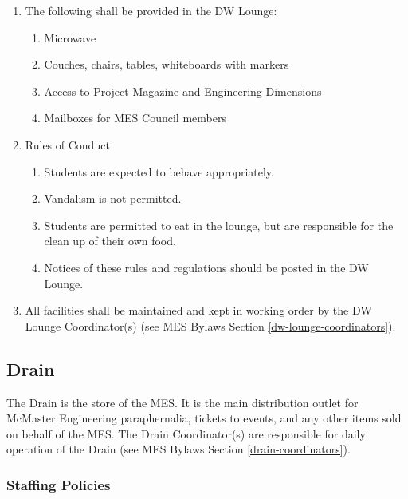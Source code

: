 \begin{enumerate}
 \item
  The following shall be provided in the DW Lounge:

  \begin{enumerate}
   \item
    Microwave
   \item
    Couches, chairs, tables, whiteboards with markers
   \item
    Access to Project Magazine and Engineering Dimensions
   \item
    Mailboxes for MES Council members
  \end{enumerate}
 \item
  Rules of Conduct

  \begin{enumerate}
   \item
    Students are expected to behave appropriately.
   \item
    Vandalism is not permitted.
   \item
    Students are permitted to eat in the lounge, but are responsible for the clean up of their own food.
   \item
    Notices of these rules and regulations should be posted in the DW Lounge.
  \end{enumerate}
 \item
  All facilities shall be maintained and kept in working order by the DW Lounge Coordinator(s) (see MES Bylaws Section \ref{dw-lounge-coordinators}).
\end{enumerate}
\subsection{Drain}
\label{drain}

The Drain is the store of the MES. It is the main distribution outlet for McMaster Engineering paraphernalia, tickets to events, and any other items sold on behalf of the MES. The Drain Coordinator(s) are responsible for daily operation of the Drain (see MES Bylaws Section \ref{drain-coordinators}).

\subsubsection{Staffing Policies}
\label{staffing-policies}


